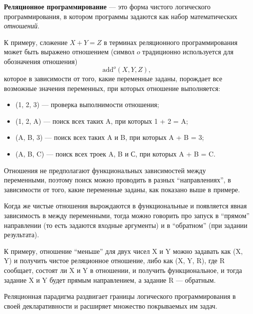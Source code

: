 {\bf Реляционное программирование} --- это форма чистого логического программирования,
в котором программы задаются как набор математических {\it отношений}.

К примеру, сложение $X + Y = Z$ в терминах реляционного программирования может
быть выражено отношением (символ $o$ традиционно используется для обозначения отношения)
\[\text{add}^o (X, Y, Z),\]
которое в зависимости от того, какие переменные заданы, порождает
все возможные значения переменных, при которых отношение выполняется:
\begin{itemize}
\item {}(1, 2, 3) --- проверка выполнимости отношения;
\item {}(1, 2, A) --- поиск всех таких A, при которых 1 + 2 = A;
\item {}(A, B, 3) --- поиск всех таких A и B, при которых A + B = 3;
\item {}(A, B, C) --- поиск всех троек A, B и С, при которых A + B = C.
\end{itemize}

Отношения не предполагают функциональных зависимостей между переменными, поэтому
поиск можно проводить в разных ``направлениях'', в зависимости от того, какие переменные
заданы, как показано выше в примере.

Когда же чистые отношения вырождаются в функциональные и появляется
явная зависимость в между переменными, тогда можно говорить про запуск
в ``прямом'' направлении (то есть задаются входные аргументы) и в ``обратном''
(при задании результата).

К примеру, отношение ``меньше'' для двух чисел X и Y можно задавать как (X, Y) и
получить чистое реляционное отношение, либо
как (X, Y, R), где R сообщает, состоят ли X и Y в отношении,
и получить функциональное, и тогда задание X и Y будет прямым направлением, а задание R --- обратным.

Реляционная парадигма раздвигает границы логического программирования в своей декларативности
и расширяет множество покрываемых им задач.

%
